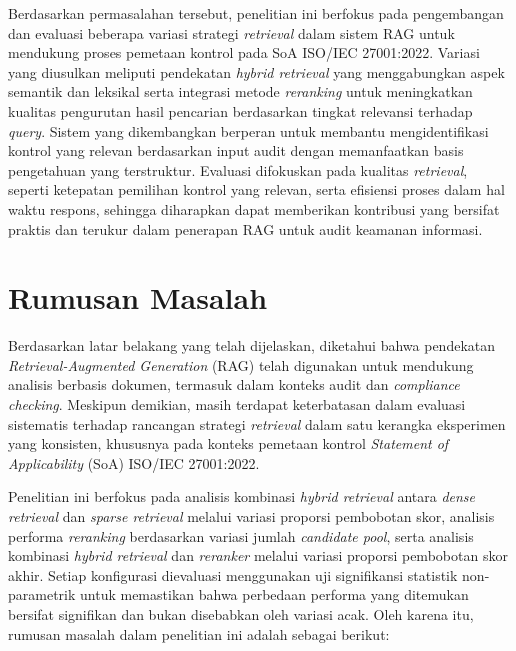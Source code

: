 Berdasarkan permasalahan tersebut, penelitian ini berfokus pada pengembangan dan evaluasi beberapa variasi strategi \textit{retrieval} dalam sistem RAG untuk mendukung proses pemetaan kontrol pada SoA ISO/IEC 27001:2022. Variasi yang diusulkan meliputi pendekatan \textit{hybrid retrieval} yang menggabungkan aspek semantik dan leksikal serta integrasi metode \textit{reranking} untuk meningkatkan kualitas pengurutan hasil pencarian berdasarkan tingkat relevansi terhadap \textit{query}. Sistem yang dikembangkan berperan untuk membantu mengidentifikasi kontrol yang relevan berdasarkan input audit dengan memanfaatkan basis pengetahuan yang terstruktur. Evaluasi difokuskan pada kualitas \textit{retrieval}, seperti ketepatan pemilihan kontrol yang relevan, serta efisiensi proses dalam hal waktu respons, sehingga diharapkan dapat memberikan kontribusi yang bersifat praktis dan terukur dalam penerapan RAG untuk audit keamanan informasi.

\section{Rumusan Masalah}
Berdasarkan latar belakang yang telah dijelaskan, diketahui bahwa pendekatan \textit{Retrieval-Augmented Generation} (RAG) telah digunakan untuk mendukung analisis berbasis dokumen, termasuk dalam konteks audit dan \textit{compliance checking}. Meskipun demikian, masih terdapat keterbatasan dalam evaluasi sistematis terhadap rancangan strategi \textit{retrieval} dalam satu kerangka eksperimen yang konsisten, khususnya pada konteks pemetaan kontrol \textit{Statement of Applicability} (SoA) ISO/IEC 27001:2022.

Penelitian ini berfokus pada analisis kombinasi \textit{hybrid retrieval} antara \textit{dense retrieval} dan \textit{sparse retrieval} melalui variasi proporsi pembobotan skor, analisis performa \textit{reranking} berdasarkan variasi jumlah \textit{candidate pool}, serta analisis kombinasi \textit{hybrid retrieval} dan \textit{reranker} melalui variasi proporsi pembobotan skor akhir. Setiap konfigurasi dievaluasi menggunakan uji signifikansi statistik non-parametrik untuk memastikan bahwa perbedaan performa yang ditemukan bersifat signifikan dan bukan disebabkan oleh variasi acak. Oleh karena itu, rumusan masalah dalam penelitian ini adalah sebagai berikut:

